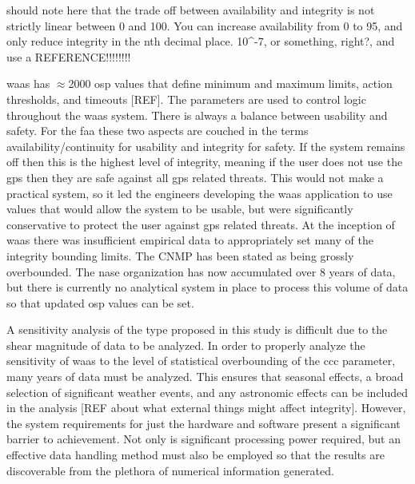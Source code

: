 should note here that the trade off between availability and integrity is not strictly linear between 0 and 100.  You can increase availability from 0 to 95, and only reduce integrity in the nth decimal place.  10^-7, or something, right?, and use a REFERENCE!!!!!!!!

\ac{waas} has $\approx$2000 \ac{osp} values that define minimum and maximum limits, action thresholds, and timeouts [REF]. The parameters are used to control logic throughout the \ac{waas} system. There is always a balance between usability and safety.  For the \ac{faa} these two aspects are couched in the terms availability/continuity for usability and integrity for safety.  If the system remains off then this is the highest level of integrity, meaning if the user does not use the \ac{gps} then they are safe against all \ac{gps} related threats.  This would not make a practical system, so it led the engineers developing the \ac{waas} application to use values that would allow the system to be usable, but were significantly conservative to protect the user against \ac{gps} related threats.  At the inception of \ac{waas} there was insufficient empirical data to appropriately set many of the integrity bounding limits.  The CNMP has been stated as being grossly overbounded\citep[p.61]{HMIDoc}.  The \ac{nase} organization has now accumulated over 8 years of data, but there is currently no analytical system in place to process this volume of data so that updated \ac{osp} values can be set.

A sensitivity analysis of the type proposed in this study is difficult due to the shear magnitude of data to be analyzed. In order to properly analyze the sensitivity of \ac{waas} to the level of statistical overbounding of the \ac{ccc} parameter, many years of data must be analyzed.  This ensures that seasonal effects, a broad selection of significant weather events, and any astronomic effects can be included in the analysis [REF about what external things might affect integrity].  However, the system requirements for just the hardware and software present a significant barrier to achievement. Not only is significant processing power required, but an effective data handling method must also be employed so that the results are discoverable from the plethora of numerical information generated.  %


